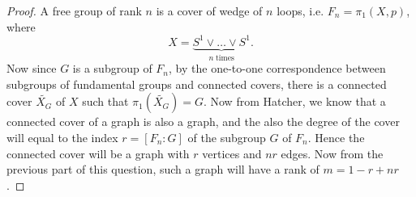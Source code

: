 \documentclass{article}
\begin{document}
\begin{enumerate}[label={\bf Q\arabic*:}]
\begin{enumerate}
        \begin{proof}
          A free group of rank $n$ is a cover of wedge of $n$ loops, i.e.
          $F_n=\pi_1(X,p)$, where
          \begin{equation*}
            X = \underbrace{S^1\vee\ldots\vee S^1}_{n\;\text{times}}.
          \end{equation*}
          Now since $G$ is a subgroup of $F_n$, by the one-to-one
          correspondence between subgroups of fundamental groups and
          connected covers, there is a connected cover $\tilde{X_G}$ of $X$
          such that $\pi_1(\tilde{X_G})=G$. Now from Hatcher, we know that
          a connected cover of a graph is also a graph, and the also the
          degree of the cover will equal to the index $r=[F_n:G]$ of the
          subgroup $G$ of $F_n$. Hence the connected cover will be a graph
          with $r$ vertices and $nr$ edges. Now from the previous part of
          this question, such a graph will have a rank of $m=1-r+nr$.
        \end{proof}
    \end{enumerate}
\end{enumerate}
\end{document}
